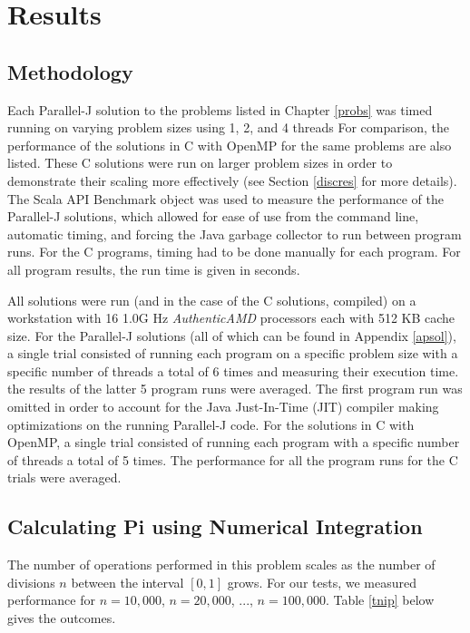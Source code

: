 \chapter{Results}
\label{res}

\section{Methodology}
Each Parallel-J solution to the problems listed in Chapter \ref{probs} 
was timed running on varying problem sizes using 1, 2, and 4 threads
For comparison, the performance of the solutions in 
C with OpenMP for the same problems are also listed. 
These C solutions were run on larger problem sizes 
in order to demonstrate their scaling more effectively 
(see Section \ref{discres} for more details).
The Scala API Benchmark object was used to measure the performance of the Parallel-J solutions, 
which allowed for ease of use from the command line, automatic timing, 
and forcing the Java garbage collector to run between program runs. 
For the C programs, timing had to be done manually for each program. 
For all program results, the run time is given in seconds.

All solutions were run (and in the case of the C solutions, compiled) 
on a workstation with 16 1.0G Hz \textit{AuthenticAMD} processors each with 512 KB cache size.
For the Parallel-J solutions (all of which can be found in Appendix \ref{apsol}), 
a single trial consisted of running each program 
on a specific problem size with a specific number of threads 
a total of 6 times and measuring their execution time. 
the results of the latter 5 program runs were averaged. 
The first program run was omitted in order to account for 
the Java Just-In-Time (JIT) compiler making optimizations on the running Parallel-J code.
For the solutions in C with OpenMP,
a single trial consisted of running each program with a specific number of threads a total of 5 times. 
The performance for all the program runs for the C trials were averaged.

\section{Calculating Pi using Numerical Integration}
\label{respi}
The number of operations performed in this problem scales 
as the number of divisions $n$ between the interval $[0,1]$ grows. 
For our tests, we measured performance for $n=10,000$, $n=20,000$, ..., $n=100,000$.
Table \ref{tnip} below gives the outcomes.

